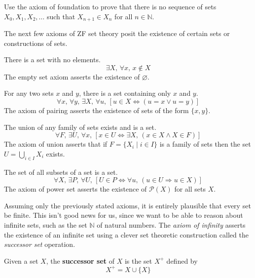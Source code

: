 \begin{exercise}
\label{exStrictlyDecreasingSequenceOfSets}
Use the axiom of foundation to prove that there is no sequence of sets $X_0,X_1,X_2,\dots$ such that $X_{n+1} \in X_n$ for all $n \in \mathbb{N}$.
\end{exercise}

The next few axioms of ZF set theory posit the existence of certain sets or constructions of sets.

\begin{axiom}
\label{axZFCEmptySet}
There is a set with no elements.
\[ \exists X,\, \forall x,\, x \not \in X \]
The empty set axiom asserts the existence of $\varnothing$.
\end{axiom}

\begin{axiom}
\label{axZFCPairing}
For any two sets $x$ and $y$, there is a set containing only $x$ and $y$.
\[ \forall x,\, \forall y,\, \exists X,\, \forall u,\, [u \in X \Leftrightarrow (u=x \vee u=y)] \]
The axiom of pairing asserts the existence of sets of the form $\{ x, y \}$.
\end{axiom}

\begin{axiom}
\label{axZFCUnion}
The union of any family of sets exists and is a set.
\[ \forall F,\, \exists U,\, \forall x,\, [x \in U \Leftrightarrow \exists X,\, (x \in X \wedge X \in F)] \]
The axiom of union asserts that if $F = \{ X_i \mid i \in I \}$ is a family of sets then the set $U=\bigcup_{i \in I} X_i$ exists.
\end{axiom}

\begin{axiom}
\label{axZFCPowerSet}
The set of all subsets of a set is a set.
\[ \forall X,\, \exists P,\, \forall U,\, [U \in P \Leftrightarrow \forall u,\, (u \in U \Rightarrow u \in X)] \]
The axiom of power set asserts the existence of $\mathcal{P}(X)$ for all sets $X$.
\end{axiom}

Assuming only the previously stated axioms, it is entirely plausible that every set be finite. This isn't good news for us, since we want to be able to reason about infinite sets, such as the set $\mathbb{N}$ of natural numbers. The \textit{axiom of infinity} asserts the existence of an infinite set using a clever set theoretic construction called the \textit{successor set} operation.

\begin{definition}
\label{defSuccessorSet}
\label{successor set}
Given a set $X$, the \textbf{successor set} of $X$ is the set $X^+$ defined by
\[ X^+ = X \cup \{ X \} \]
\end{definition}

